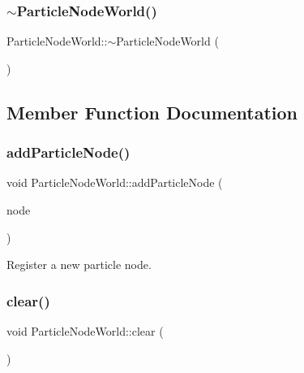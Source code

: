 \subsubsection{\texorpdfstring{$\sim$\+Particle\+Node\+World()}{~ParticleNodeWorld()}}
{\footnotesize\ttfamily Particle\+Node\+World\+::$\sim$\+Particle\+Node\+World (\begin{DoxyParamCaption}{ }\end{DoxyParamCaption})\hspace{0.3cm}{\ttfamily [default]}}



\subsection{Member Function Documentation}
\mbox{\label{class_particle_node_world_a384ebb3eab353b6508a4eae8d2c8ec95}} 
\subsubsection{\texorpdfstring{add\+Particle\+Node()}{addParticleNode()}}
{\footnotesize\ttfamily void Particle\+Node\+World\+::add\+Particle\+Node (\begin{DoxyParamCaption}\item[{\mbox{\hyperlink{class_particle_node}{Particle\+Node}} $\ast$}]{node }\end{DoxyParamCaption})}



Register a new particle node. 

\mbox{\label{class_particle_node_world_a19654bc33ccf9caa6265254e13768aa3}} 
\subsubsection{\texorpdfstring{clear()}{clear()}}
{\footnotesize\ttfamily void Particle\+Node\+World\+::clear (\begin{DoxyParamCaption}{ }\end{DoxyParamCaption})}



